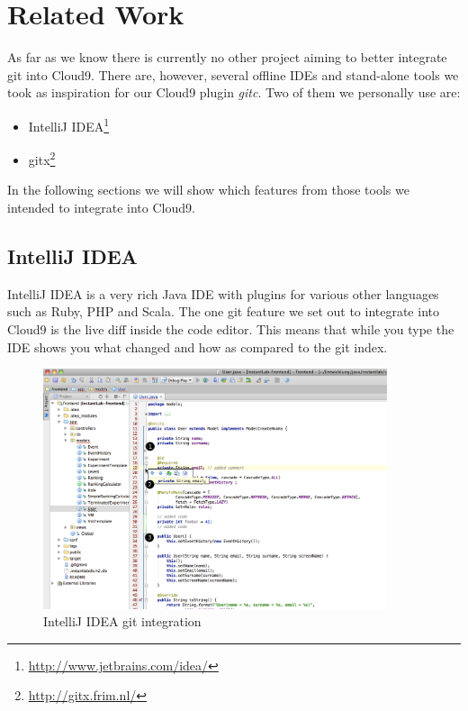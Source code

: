 \section{Related Work}
\label{sec:Related_Work}

As far as we know there is currently no other project aiming to better integrate git into Cloud9.
There are, however, several offline IDEs and stand-alone tools we took as inspiration for our
Cloud9 plugin \emph{gitc}.
Two of them we personally use are:
\begin{itemize}
	\item IntelliJ IDEA\footnote{\url{http://www.jetbrains.com/idea/}}
	\item gitx\footnote{\url{http://gitx.frim.nl/}}
\end{itemize}
In the following sections we will show which features from those tools we intended to integrate into Cloud9.

\subsection{IntelliJ IDEA}
\label{subsec:IntelliJ_IDEA}

IntelliJ IDEA is a very rich Java IDE with plugins for various other languages such as Ruby, PHP and Scala.
The one git feature we set out to integrate into Cloud9 is the live diff inside the code editor.
This means that while you type the IDE shows you what changed and how as compared to the git index.

\begin{figure}
	\centering
	\includegraphics[width=0.9\textwidth]{images/idea-git.png}
	\caption{IntelliJ IDEA git integration}
	\label{fig:idea}
\end{figure}

